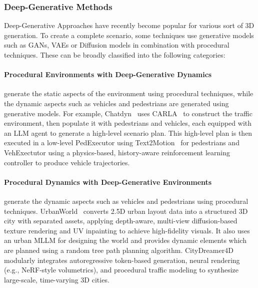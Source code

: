 \documentclass{article}
\begin{document}
\subsubsection{Deep-Generative Methods}

Deep-Generative Approaches have recently become popular for various sort of 3D generation. To create a complete scenario, some techniques use generative models such as GANs, VAEs or Diffusion models in combination with procedural techniques. These can be broadly classified into the following categories:

\paragraph{Procedural Environments with Deep-Generative Dynamics} generate the static aspects of the environment using procedural techniques, while the dynamic aspects such as vehicles and pedestrians are generated using generative models. For example, Chatdyn~\cite{wei2024chatdyn} uses CARLA~\cite{dosovitskiy2017carla} to construct the traffic environment, then populate it with pedestrians and vehicles, each equipped with an LLM agent to generate a high-level scenario plan. This high-level plan is then executed in a low-level PedExecutor using Text2Motion~\cite{guo2024momask} for pedestrians and VehExectutor using a physics-based, history-aware reinforcement learning controller to produce vehicle trajectories.

\paragraph{Procedural Dynamics with Deep-Generative Environments} generate the dynamic aspects such as vehicles and pedestrians using procedural techniques. UrbanWorld~\cite{shang2024urbanworld} converts 2.5D urban layout data into a structured 3D city with separated assets, applying depth-aware, multi-view diffusion-based texture rendering and UV inpainting to achieve high-fidelity visuals. It also uses an urban MLLM for designing the world and provides dynamic elements which are planned using a random tree path planning algorithm. CityDreamer4D~\cite{xie2024citydreamer} modularly integrates autoregressive token-based generation, neural rendering (e.g., NeRF-style volumetrics), and procedural traffic modeling to synthesize large-scale, time-varying 3D cities.
\end{document}
